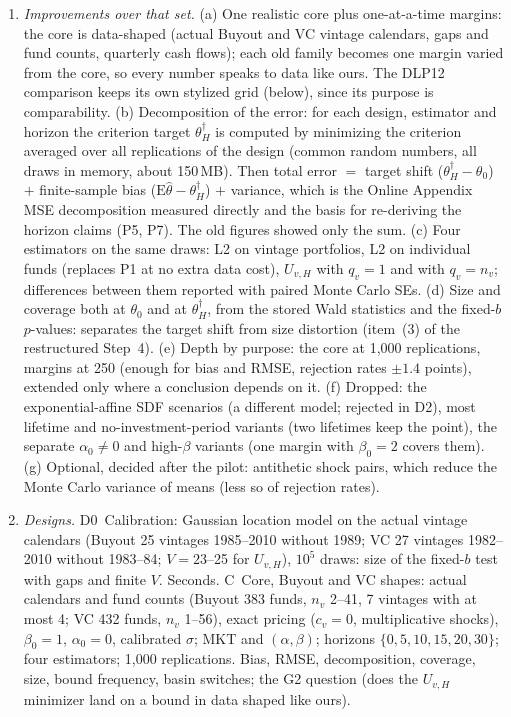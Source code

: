\documentclass[11pt]{article}
\begin{document}
\begin{enumerate}
\item \emph{Improvements over that set.}
 (a) One realistic core plus one-at-a-time margins: the core is data-shaped (actual Buyout and VC vintage calendars, gaps and fund counts, quarterly cash flows); each old family becomes one margin varied from the core, so every number speaks to data like ours. The DLP12 comparison keeps its own stylized grid (below), since its purpose is comparability.
 (b) Decomposition of the error: for each design, estimator and horizon the criterion target $\theta_H^\dagger$ is computed by minimizing the criterion averaged over all replications of the design (common random numbers, all draws in memory, about 150\,MB). Then total error $=$ target shift ($\theta_H^\dagger-\theta_0$) $+$ finite-sample bias ($\mathrm{E}\hat\theta-\theta_H^\dagger$) $+$ variance, which is the Online Appendix MSE decomposition measured directly and the basis for re-deriving the horizon claims (P5, P7). The old figures showed only the sum.
 (c) Four estimators on the same draws: L2 on vintage portfolios, L2 on individual funds (replaces P1 at no extra data cost), $U_{v,H}$ with $q_v=1$ and with $q_v=n_v$; differences between them reported with paired Monte Carlo SEs.
 (d) Size and coverage both at $\theta_0$ and at $\theta_H^\dagger$, from the stored Wald statistics and the fixed-$b$ $p$-values: separates the target shift from size distortion (item~(3) of the restructured Step~4).
 (e) Depth by purpose: the core at 1{,}000 replications, margins at 250 (enough for bias and RMSE, rejection rates $\pm1.4$ points), extended only where a conclusion depends on it.
 (f) Dropped: the exponential-affine SDF scenarios (a different model; rejected in D2), most lifetime and no-investment-period variants (two lifetimes keep the point), the separate $\alpha_0\neq0$ and high-$\beta$ variants (one margin with $\beta_0=2$ covers them).
 (g) Optional, decided after the pilot: antithetic shock pairs, which reduce the Monte Carlo variance of means (less so of rejection rates).
\item \emph{Designs.}
 D0~Calibration: Gaussian location model on the actual vintage calendars (Buyout 25 vintages 1985--2010 without 1989; VC 27 vintages 1982--2010 without 1983--84; $V=23$--25 for $U_{v,H}$), $10^5$ draws: size of the fixed-$b$ test with gaps and finite $V$. Seconds.
 C~Core, Buyout and VC shapes: actual calendars and fund counts (Buyout 383 funds, $n_v$ 2--41, 7 vintages with at most 4; VC 432 funds, $n_v$ 1--56), exact pricing ($c_v=0$, multiplicative shocks), $\beta_0=1$, $\alpha_0=0$, calibrated $\sigma$; MKT and $(\alpha,\beta)$; horizons $\{0,5,10,15,20,30\}$; four estimators; 1{,}000 replications. Bias, RMSE, decomposition, coverage, size, bound frequency, basin switches; the G2 question (does the $U_{v,H}$ minimizer land on a bound in data shaped like ours).

\end{enumerate}
\end{document}
